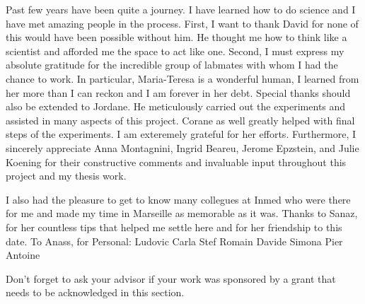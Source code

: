Past few years have been quite a journey.
I have learned how to do science and I have met amazing people in the process.
First, I want to thank David for none of this would have been possible without him.
He thought me how to think like a scientist and afforded me the space to act like one.
Second, I must express my absolute gratitude for the incredible group of labmates with whom I had the chance to work.
In particular, Maria-Teresa is a wonderful human, I learned from her more than I can reckon and I am forever in her debt.
Special thanks should also be extended to Jordane.
He meticulously carried out the experiments and assisted in many aspects of this project.
Corane as well greatly helped with final steps of the experiments.
I am exteremely grateful for her efforts.
Furthermore, I sincerely appreciate Anna Montagnini, Ingrid Beareu, Jerome Epzstein, and Julie Koening for their constructive comments and invaluable input throughout this project and my thesis work.
\par
I also had the pleasure to get to know many collegues at Inmed who were there for me and made my time in Marseille as memorable as it was.
Thanks to Sanaz, for her countless tips that helped me settle here and for her friendship to this date.
To Anass, for 
Personal:
Ludovic
Carla
Stef
Romain
Davide
Simona
Pier Antoine






Don't forget to ask your advisor if your work was sponsored by a grant that needs to be acknowledged in this section.  